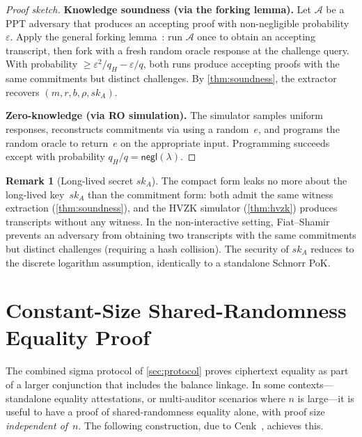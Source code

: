 \documentclass[11pt]{article}
\theoremstyle{definition}
\newtheorem{remark}[theorem]{Remark}
\newcommand{\sk}{\mathit{sk}}
\newcommand{\negl}{\mathsf{negl}}
\begin{document}
\begin{proof}[Proof sketch]
  \textbf{Knowledge soundness (via the forking lemma).}
  Let $\mathcal{A}$ be a PPT adversary that produces an accepting
  proof with non-negligible probability~$\varepsilon$.
  Apply the general forking lemma~\cite{BellareNeven2006}:
  run $\mathcal{A}$ once to obtain an accepting transcript,
  then fork with a fresh random oracle response at the challenge
  query.
  With probability $\ge \varepsilon^2/q_H - \varepsilon/q$, both
  runs produce accepting proofs with the same commitments but distinct
  challenges.
  By \cref{thm:soundness}, the extractor recovers
  $(m, r, b, \rho, \sk_A)$.

  \medskip
  \textbf{Zero-knowledge (via RO simulation).}
  The simulator samples uniform responses, reconstructs commitments
  via  using a random~$e$,
  and programs the random oracle to return~$e$ on the appropriate
  input.
  Programming succeeds except with probability
  $q_H / q = \negl(\lambda)$.
\end{proof}

\begin{remark}[Long-lived secret $\sk_A$]
  \label{rem:long-lived}
  The compact form leaks no more about the long-lived key~$\sk_A$
  than the commitment form: both admit the same witness extraction
  (\cref{thm:soundness}), and the HVZK simulator (\cref{thm:hvzk})
  produces transcripts without any witness.
  In the non-interactive setting, Fiat--Shamir prevents an adversary
  from obtaining two transcripts with the same commitments but distinct
  challenges (requiring a hash collision).
  The security of $\sk_A$ reduces to the discrete logarithm
  assumption, identically to a standalone Schnorr PoK.
\end{remark}

\section{Constant-Size Shared-Randomness Equality Proof}
\label{sec:equality-o1}

The combined sigma protocol of \cref{sec:protocol} proves ciphertext
equality as part of a larger conjunction that includes the balance
linkage.
In some contexts---standalone equality attestations, or multi-auditor
scenarios where $n$ is large---it is useful to have a proof of
shared-randomness equality alone, with proof size
\emph{independent of}~$n$.
The following construction, due to
Cenk~\cite{Cenk2026unification}, achieves this.
\end{document}

